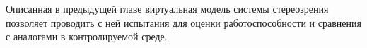 Описанная в предыдущей главе виртуальная модель системы стереозрения позволяет проводить 
с ней испытания для оценки работоспособности и сравнения с аналогами в контролируемой среде.            %